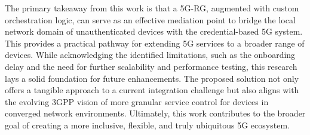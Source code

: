 The primary takeaway from this work is that a \ac{5G-RG}, augmented with custom orchestration logic, can serve as an effective mediation point to bridge the local network domain of unauthenticated devices with the credential-based \ac{5G} system. This provides a practical pathway for extending \ac{5G} services to a broader range of devices. While acknowledging the identified limitations, such as the onboarding delay and the need for further scalability and performance testing, this research lays a solid foundation for future enhancements. The proposed solution not only offers a tangible approach to a current integration challenge but also aligns with the evolving \ac{3GPP} vision of more granular service control for devices in converged network environments. Ultimately, this work contributes to the broader goal of creating a more inclusive, flexible, and truly ubiquitous \ac{5G} ecosystem.